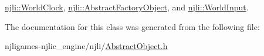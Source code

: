 \mbox{\hyperlink{classnjli_1_1_world_clock_a0ebeaf0636f48e20734bf05dee514ff3}{njli\+::\+World\+Clock}}, \mbox{\hyperlink{classnjli_1_1_abstract_factory_object_a838f4fa7e65cace6098aab5222892942}{njli\+::\+Abstract\+Factory\+Object}}, and \mbox{\hyperlink{classnjli_1_1_world_input_a69448c86610047b676f79439d7e57662}{njli\+::\+World\+Input}}.



The documentation for this class was generated from the following file\+:\begin{DoxyCompactItemize}
\item 
njligames-\/njlic\+\_\+engine/njli/\mbox{\hyperlink{_abstract_object_8h}{Abstract\+Object.\+h}}\end{DoxyCompactItemize}

